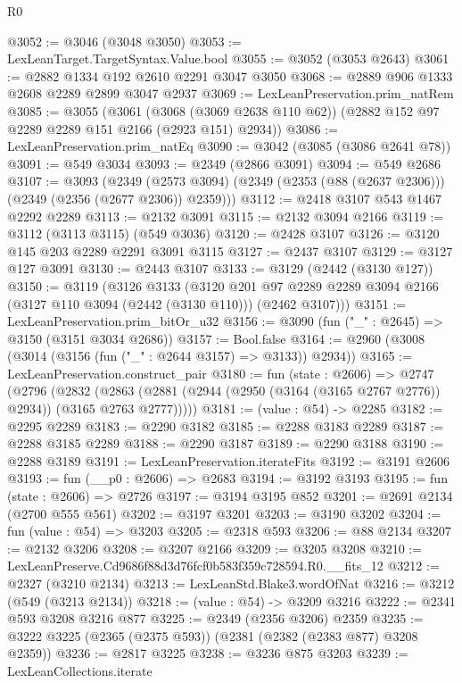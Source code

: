 \begin{lexlean}{R0}
\begin{coremodule}
@3052 := @3046 (@3048 @3050)
@3053 := LexLeanTarget.TargetSyntax.Value.bool
@3055 := @3052 (@3053 @2643)
@3061 := @2882 @1334 @192 @2610 @2291 @3047 @3050
@3068 := @2889 @906 @1333 @2608 @2289 @2899 @3047 @2937
@3069 := LexLeanPreservation.prim_natRem
@3085 := @3055
    (@3061
      (@3068 (@3069 @2638 @110 @62))
      (@2882 @152 @97 @2289 @2289 @151 @2166 (@2923 @151) @2934))
@3086 := LexLeanPreservation.prim_natEq
@3090 := @3042 (@3085 (@3086 @2641 @78))
@3091 := @549 @3034
@3093 := @2349 (@2866 @3091)
@3094 := @549 @2686
@3107 := @3093
    (@2349 (@2573 @3094) (@2349 (@2353 (@88 (@2637 @2306))) (@2349 (@2356 (@2677 @2306)) @2359)))
@3112 := @2418 @3107 @543 @1467 @2292 @2289
@3113 := @2132 @3091
@3115 := @2132 @3094 @2166
@3119 := @3112 (@3113 @3115) (@549 @3036)
@3120 := @2428 @3107
@3126 := @3120 @145 @203 @2289 @2291 @3091 @3115
@3127 := @2437 @3107
@3129 := @3127 @127 @3091
@3130 := @2443 @3107
@3133 := @3129 (@2442 (@3130 @127))
@3150 := @3119
    (@3126
      @3133
      (@3120
        @201
        @97
        @2289
        @2289
        @3094
        @2166
        (@3127 @110 @3094 (@2442 (@3130 @110)))
        (@2462 @3107)))
@3151 := LexLeanPreservation.prim_bitOr_u32
@3156 := @3090 (fun ("_" : @2645) => @3150 (@3151 @3034 @2686))
@3157 := Bool.false
@3164 := @2960 (@3008 (@3014 (@3156 (fun ("_" : @2644 @3157) => @3133)) @2934))
@3165 := LexLeanPreservation.construct_pair
@3180 := fun (state : @2606) =>
  @2747
    (@2796
      (@2832 (@2863 (@2881 (@2944 (@2950 (@3164 (@3165 @2767 @2776)) @2934)) (@3165 @2763 @2777)))))
@3181 := (value : @54) -> @2285
@3182 := @2295 @2289
@3183 := @2290 @3182
@3185 := @2288 @3183 @2289
@3187 := @2288 @3185 @2289
@3188 := @2290 @3187
@3189 := @2290 @3188
@3190 := @2288 @3189
@3191 := LexLeanPreservation.iterateFits
@3192 := @3191 @2606
@3193 := fun (__p0 : @2606) => @2683
@3194 := @3192 @3193
@3195 := fun (state : @2606) => @2726
@3197 := @3194 @3195 @852
@3201 := @2691 @2134 (@2700 @555 @561)
@3202 := @3197 @3201
@3203 := @3190 @3202
@3204 := fun (value : @54) => @3203
@3205 := @2318 @593
@3206 := @88 @2134
@3207 := @2132 @3206
@3208 := @3207 @2166
@3209 := @3205 @3208
@3210 := LexLeanPreserve.Cd9686f88d3d76fcf0b583f359c728594.R0.__fits_12
@3212 := @2327 (@3210 @2134)
@3213 := LexLeanStd.Blake3.wordOfNat
@3216 := @3212 (@549 (@3213 @2134))
@3218 := (value : @54) -> @3209 @3216
@3222 := @2341 @593 @3208 @3216 @877
@3225 := @2349 (@2356 @3206) @2359
@3235 := @3222 @3225 (@2365 (@2375 @593)) (@2381 (@2382 (@2383 @877) @3208 @2359))
@3236 := @2817 @3225
@3238 := @3236 @875 @3203
@3239 := LexLeanCollections.iterate

\end{coremodule}
\end{lexlean}
